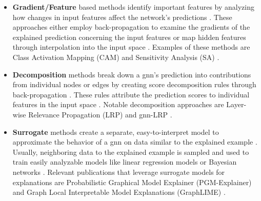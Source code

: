 \begin{itemize}
    \item \textbf{Gradient/Feature} based methods identify important features by analyzing how changes in input features affect the network's predictions \cite{yuan_explainability_2020}. These approaches either employ back-propagation to examine the gradients of the explained prediction concerning the input features or map hidden features through interpolation into the input space \cite{yuan_explainability_2020}. Examples of these methods are Class Activation Mapping (CAM)\cite{pope_explainability_2019} and Sensitivity Analysis (SA) \cite{baldassarre_explainability_2019}.
    
    \item \textbf{Decomposition} methods break down a \gls{gnn}'s prediction into contributions from individual nodes or edges by creating score decomposition rules through back-propagation \cite{yuan_explainability_2020}. These rules attribute the prediction scores to individual features in the input space \cite{yuan_explainability_2020, baldassarre_explainability_2019}. Notable decomposition approaches are Layer-wise Relevance Propagation (LRP) \cite{baldassarre_explainability_2019} and \gls{gnn}-LRP \cite{schnake_higher-order_2022}.
    
    \item \textbf{Surrogate} methods create a separate, easy-to-interpret model to approximate the behavior of a \gls{gnn} on data similar to the explained example \cite{yuan_explainability_2020}. Usually, neighboring data to the explained example is sampled and used to train easily analyzable models \cite{huang_graphlime_2023} like linear regression models \cite{duval_graphsvx_2021} or Bayesian networks \cite{vu_pgm-explainer_2020}. Relevant publications that leverage surrogate models for explanations are Probabilistic Graphical Model Explainer (PGM-Explainer) \cite{vu_pgm-explainer_2020} and Graph Local Interpretable Model Explanations (GraphLIME) \cite{huang_graphlime_2023}.
    

\end{itemize}
